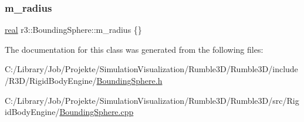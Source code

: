 \subsubsection{\texorpdfstring{m\+\_\+radius}{m\_radius}}
{\footnotesize\ttfamily \mbox{\hyperlink{namespacer3_ab2016b3e3f743fb735afce242f0dc1eb}{real}} r3\+::\+Bounding\+Sphere\+::m\+\_\+radius \{\}\hspace{0.3cm}{\ttfamily [protected]}}



The documentation for this class was generated from the following files\+:\begin{DoxyCompactItemize}
\item 
C\+:/\+Library/\+Job/\+Projekte/\+Simulation\+Visualization/\+Rumble3\+D/\+Rumble3\+D/include/\+R3\+D/\+Rigid\+Body\+Engine/\mbox{\hyperlink{_bounding_sphere_8h}{Bounding\+Sphere.\+h}}\item 
C\+:/\+Library/\+Job/\+Projekte/\+Simulation\+Visualization/\+Rumble3\+D/\+Rumble3\+D/src/\+Rigid\+Body\+Engine/\mbox{\hyperlink{_bounding_sphere_8cpp}{Bounding\+Sphere.\+cpp}}\end{DoxyCompactItemize}
